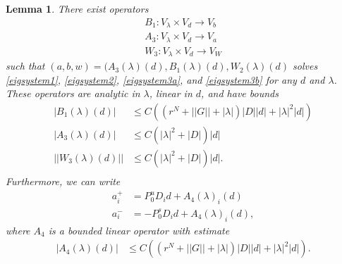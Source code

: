 \documentclass[12pt]{article}
\newtheorem{lemma}{Lemma}
\begin{document}
\begin{lemma}\label{eiginv3}
There exist operators 
\begin{align*}
B_1 : V_\lambda \times V_d \rightarrow V_b \\
A_3 : V_\lambda \times V_d \rightarrow V_a \\
W_3 : V_\lambda \times V_d \rightarrow V_W
\end{align*}
such that $(a, b, w) = (A_3(\lambda)(d), B_1(\lambda)(d), W_2(\lambda)(d)$ solves \eqref{eigsystem1}, \eqref{eigsystem2}, \eqref{eigsystem3a}, and \eqref{eigsystem3b} for any $d$ and $\lambda$. These operators are analytic in $\lambda$, linear in $d$, and have bounds 
\begin{align}
|B_1(\lambda)(d)| &\leq C \left( (r^{N} + ||G|| + |\lambda|)|D| |d| + |\lambda|^2 |d| \right) \label{B1bound} \\
|A_3(\lambda)(d)| &\leq C \left(|\lambda|^2 + |D|\right)|d| \label{A3bound} \\
||W_3(\lambda)(d)|| &\leq C \left(|\lambda|^2 + |D|\right)|d|. \label{W3bound} \\
\end{align}
Furthermore, we can write
\begin{align*}
a_i^+ &= P_0^u D_i d + A_4(\lambda)_i(d) \\
a_i^- &= -P_0^s D_i d + A_4(\lambda)_i(d),
\end{align*}
where $A_4$ is a bounded linear operator with estimate
\begin{align}\label{A4bound}
|A_4(\lambda)(d)| &\leq 
C\left( (r^N + ||G|| + |\lambda|)|D||d| + |\lambda|^2 |d|  \right).
\end{align}


\end{lemma}
\end{document}
